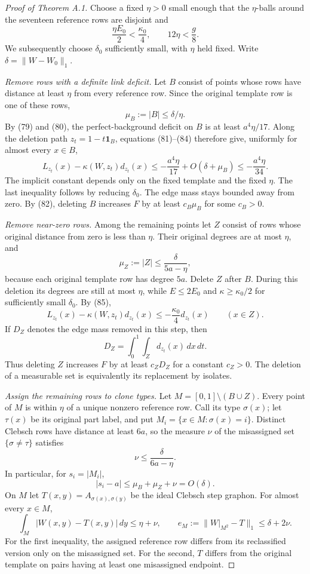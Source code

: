 \begin{proof}[Proof of Theorem A.1]
Choose a fixed $\eta>0$ small enough that the $\eta$-balls around
the seventeen reference rows are disjoint and
\[
 \frac{\eta E_0}{2}<\frac{\kappa_0}{4},\qquad
 12\eta<\frac g8.
\]
We subsequently choose $\delta_0$ sufficiently small, with $\eta$
held fixed. Write $\delta=\lVert W-W_0\rVert_1$.

\emph{Remove rows with a definite link deficit.} Let $B$ consist of
points whose rows have distance at least $\eta$ from every reference
row. Since the original template row is one of these rows,
\[
 \mu_B:=|B|\leq\delta/\eta.
\]
By (79) and (80), the perfect-background deficit on $B$ is at least
$a^4\eta/17$. Along the deletion path $z_t=1-t\mathbf1_B$,
equations (81)--(84) therefore give, uniformly for almost every
$x\in B$,
\[
 L_{z_t}(x)-\kappa(W,z_t)d_{z_t}(x)
 \leq-\frac{a^4\eta}{17}+O(\delta+\mu_B)
 \leq-\frac{a^4\eta}{34}.
\]
The implicit constant depends only on the fixed template and the
fixed $\eta$. The last inequality follows by reducing $\delta_0$.
The edge mass stays bounded away from zero. By (82), deleting $B$
increases $F$ by at least $c_B\mu_B$ for some $c_B>0$.

\emph{Remove near-zero rows.} Among the remaining points let $Z$
consist of rows whose original distance from zero is less than $\eta$.
Their original degrees are at most $\eta$, and
\[
 \mu_Z:=|Z|\leq\frac\delta{5a-\eta},
\]
because each original template row has degree $5a$. Delete $Z$ after
$B$. During this deletion its degrees are still at most $\eta$, while
$E\leq2E_0$ and $\kappa\geq\kappa_0/2$ for sufficiently small
$\delta_0$. By (85),
\[
 L_{z_t}(x)-\kappa(W,z_t)d_{z_t}(x)
 \leq-\frac{\kappa_0}{4}d_{z_t}(x)\qquad(x\in Z).
\]
If $D_Z$ denotes the edge mass removed in this step, then
\[
 D_Z=\int_0^1\int_Z d_{z_t}(x)\,dx\,dt.
\]
Thus deleting $Z$ increases $F$ by at least $c_ZD_Z$ for a constant
$c_Z>0$. The deletion of a measurable set is equivalently its
replacement by isolates.

\emph{Assign the remaining rows to clone types.} Let
$M=[0,1]\setminus(B\cup Z)$. Every point of $M$ is within $\eta$ of
a unique nonzero reference row. Call its type $\sigma(x)$; let
$\tau(x)$ be its original part label, and put
$M_i=\{x\in M:\sigma(x)=i\}$. Distinct Clebsch rows have distance
at least $6a$, so the measure $\nu$ of the misassigned set
$\{\sigma\ne\tau\}$ satisfies
\[
 \nu\leq\frac\delta{6a-\eta}.
\]
In particular, for $s_i=|M_i|$,
\begin{equation}\tag{89}\label{eq:reclassified-masses}
 |s_i-a|\leq\mu_B+\mu_Z+\nu=O(\delta).
\end{equation}
On $M$ let $T(x,y)=A_{\sigma(x),\sigma(y)}$ be the ideal Clebsch
step graphon. For almost every $x\in M$,
\begin{equation}\tag{90}\label{eq:reclassified-errors}
 \int_M|W(x,y)-T(x,y)|\,dy\leq\eta+\nu,\qquad
 e_M:=\lVert W|_{M^2}-T\rVert_1\leq\delta+2\nu.
\end{equation}
For the first inequality, the assigned reference row differs from its
reclassified version only on the misassigned set. For the second, $T$
differs from the original template on pairs having at least one
misassigned endpoint.


\end{proof}

